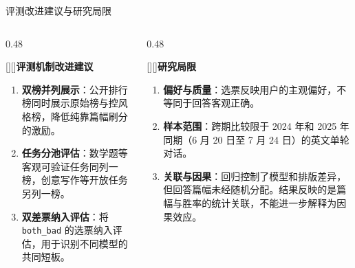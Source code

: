 \documentclass{beamer}
\begin{document}
\begin{frame}{评测改进建议与研究局限}
  \begin{columns}[T,onlytextwidth]
    \begin{column}{0.48\textwidth}
      \begin{block}{\raisebox{0.20em}[\height][\depth]{\bfseries 评测机制改进建议}}
        \footnotesize
        \begin{enumerate}
          \setlength{\itemsep}{0.86em}
          \setlength{\baselineskip}{1.055\baselineskip}
          \vspace{0.14em}
          \item \textbf{双榜并列展示}：公开排行榜同时展示原始榜与控风格榜，降低纯靠篇幅刷分的激励。
          \item \textbf{任务分池评估}：数学题等客观可验证任务同列一榜，创意写作等开放任务另列一榜。
          \item \textbf{双差票纳入评估}：将 \texttt{both\_bad} 的选票纳入评估，用于识别不同模型的共同短板。
        \end{enumerate}
      \end{block}
    \end{column}
    \begin{column}{0.48\textwidth}
      \begin{block}{\raisebox{0.20em}[\height][\depth]{\bfseries 研究局限}}
        \footnotesize
        \begin{enumerate}
          \setlength{\itemsep}{0.86em}
          \setlength{\baselineskip}{1.055\baselineskip}
          \vspace{0.14em}
          \item \textbf{偏好与质量}：选票反映用户的主观偏好，不等同于回答客观正确。
          \item \textbf{样本范围}：跨期比较限于 2024 年和 2025 年同期（6 月 20 日至 7 月 24 日）的英文单轮对话。
          \item \textbf{关联与因果}：回归控制了模型和排版差异，但回答篇幅未经随机分配。结果反映的是篇幅与胜率的统计关联，不能进一步解释为因果效应。
        \end{enumerate}
      \end{block}
    \end{column}
  \end{columns}
\end{frame}
\end{document}
